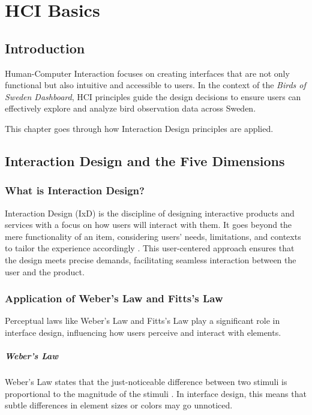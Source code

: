 \chapter{HCI Basics}

\section{Introduction}

Human-Computer Interaction focuses on creating interfaces that are not only functional but also intuitive and accessible to users. In the context of the \textit{Birds of Sweden Dashboard}, HCI principles guide the design decisions to ensure users can effectively explore and analyze bird observation data across Sweden.

This chapter goes through how Interaction Design principles are applied.

\section{Interaction Design and the Five Dimensions}

\subsection{What is Interaction Design?}

Interaction Design (IxD) is the discipline of designing interactive products and services with a focus on how users will interact with them. It goes beyond the mere functionality of an item, considering users' needs, limitations, and contexts to tailor the experience accordingly \cite{WhatInteractionDesign2024}. This user-centered approach ensures that the design meets precise demands, facilitating seamless interaction between the user and the product.

\subsection{Application of Weber's Law and Fitts's Law}

Perceptual laws like Weber's Law and Fitts's Law play a significant role in interface design, influencing how users perceive and interact with elements.

\paragraph{Weber's Law}

Weber's Law states that the just-noticeable difference between two stimuli is proportional to the magnitude of the stimuli \cite{mccrocklinInteractionDesignData2015}. In interface design, this means that subtle differences in element sizes or colors may go unnoticed.

